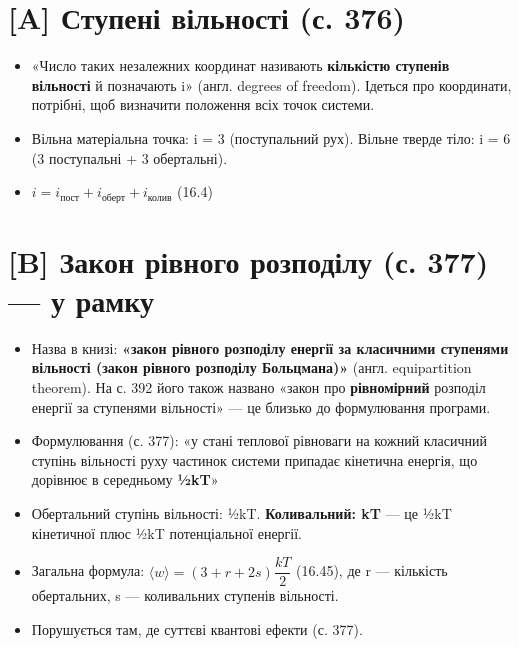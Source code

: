 \documentclass[11pt,a4paper,oneside]{book}
\begin{document}
\section*{[A] Ступені вільності (с. 376)}
\begin{itemize}
\item «Число таких незалежних координат називають \textbf{кількістю ступенів вільності} й позначають i» (англ. degrees of freedom). Ідеться про координати, потрібні, щоб визначити положення всіх точок системи.
\item Вільна матеріальна точка: i = 3 (поступальний рух). Вільне тверде тіло: i = 6 (3 поступальні + 3 обертальні).
\item $i = i_{\text{пост}} + i_{\text{оберт}} + i_{\text{колив}}$ (16.4)
\end{itemize}

\section*{[B] Закон рівного розподілу (с. 377) — у рамку}
\begin{itemize}
\item Назва в книзі: \textbf{«закон рівного розподілу енергії за класичними ступенями вільності (закон рівного розподілу Больцмана)»} (англ. equipartition theorem). На с. 392 його також названо «закон про \textbf{рівномірний} розподіл енергії за ступенями вільності» — це близько до формулювання програми.
\item Формулювання (с. 377): «у стані теплової рівноваги на кожний класичний ступінь вільності руху частинок системи припадає кінетична енергія, що дорівнює в середньому \textbf{½kT}»
\item Обертальний ступінь вільності: ½kT. \textbf{Коливальний: kT} — це ½kT кінетичної плюс ½kT потенціальної енергії.
\item Загальна формула: $\langle w\rangle = (3 + r + 2s)\dfrac{kT}{2}$ (16.45), де r — кількість обертальних, s — коливальних ступенів вільності.
\item Порушується там, де суттєві квантові ефекти (с. 377).
\end{itemize}
\end{document}
